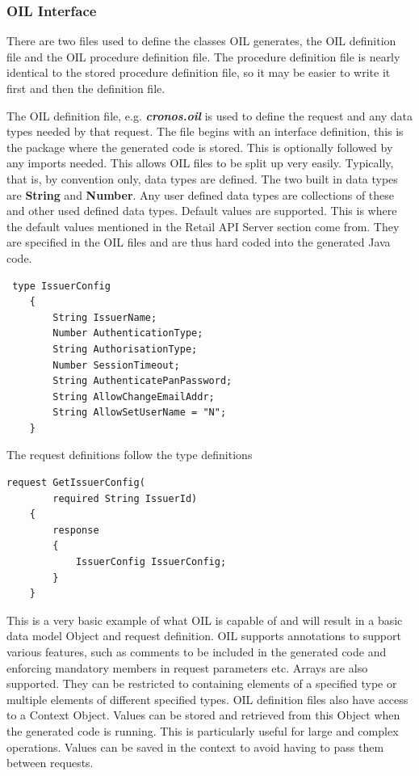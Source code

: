 \documentclass[a4paper, 11pt, titlepage]{article}
\begin{document}
\subsubsection{OIL Interface}
There are two files used to define the classes OIL generates, the OIL definition file and the OIL procedure definition file. The procedure definition file is nearly identical to the stored procedure definition file, so it may be easier to write it first and then the definition file.

The OIL definition file, e.g. \textbf{\textit{cronos.oil}} is used to define the request and any data types needed by that request. The file begins with an interface definition, this is the package where the generated code is stored. This is optionally followed by any imports needed. This allows OIL files to be split up very easily. Typically, that is, by convention only, data types are defined. The two built in data types are \textbf{String} and \textbf{Number}. Any user defined data types are collections of these and other used defined data types. Default values are supported. This is where the default values mentioned in the Retail API Server section come from. They are specified in the OIL files and are thus hard coded into the generated Java code.
\begin{verbatim}
 type IssuerConfig
    {
        String IssuerName;
        Number AuthenticationType;
        String AuthorisationType;
        Number SessionTimeout;
        String AuthenticatePanPassword;
        String AllowChangeEmailAddr;
        String AllowSetUserName = "N";
    }
\end{verbatim}
The request definitions follow the type definitions
\begin{verbatim}
request GetIssuerConfig(
        required String IssuerId)
    {
        response
        {
            IssuerConfig IssuerConfig;
        }
    }
\end{verbatim}
This is a very basic example of what OIL is capable of and will result in a basic data model Object and request definition. OIL supports annotations to support various features, such as comments to be included in the generated code and enforcing mandatory members in request parameters etc. Arrays are also supported. They can be restricted to containing elements of a specified type or multiple elements of different specified types. OIL definition files also have access to a Context Object. Values can be stored and retrieved from this Object when the generated code is running. This is particularly useful for large and complex operations. Values can be saved in the context to avoid having to pass them between requests.
\end{document}
